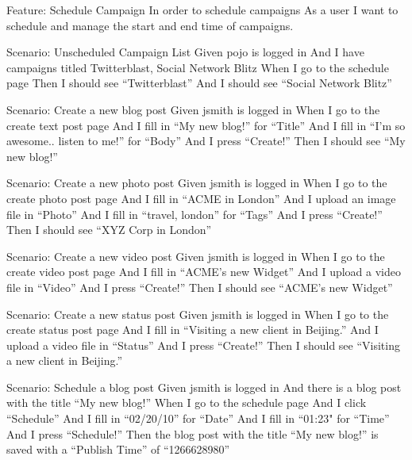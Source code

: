 \documentclass[12pt]{article}
\begin{document}
\begin{hangparas}{0.25in}{1}
Feature: Schedule Campaign 
In order to schedule campaigns 
As a user 
I want to schedule and manage the start and end time of campaigns. 

Scenario: Unscheduled Campaign List 
  Given pojo is logged in 
  And I have campaigns titled Twitterblast, Social Network Blitz 
  When I go to the schedule page 
  Then I should see ``Twitterblast'' 
  And I should see ``Social Network Blitz'' 
  
Scenario: Create a new blog post 
  Given jsmith is logged in 
  When I go to the create text post page 
  And I fill in ``My new blog!'' for ``Title''
  And I fill in ``I'm so awesome.. listen to me!'' for ``Body'' 
  And I press ``Create!'' 
  Then I should see ``My new blog!'' 
  
Scenario: Create a new photo post 
  Given jsmith is logged in 
  When I go to the create photo post page 
  And I fill in ``ACME in London'' 
  And I upload an image file in ``Photo'' 
  And I fill in ``travel, london'' for ``Tags'' 
  And I press ``Create!'' 
  Then I should see ``XYZ Corp in London'' 
  
  Scenario: Create a new video post 
    Given jsmith is logged in 
    When I go to the create video post page 
    And I fill in ``ACME's new Widget'' 
    And I upload a video file in ``Video'' 
    And I press ``Create!'' 
    Then I should see ``ACME's new Widget'' 
  
  Scenario: Create a new status post 
    Given jsmith is logged in 
    When I go to the create status post page 
    And I fill in ``Visiting a new client in Beijing.'' 
    And I upload a video file in ``Status'' 
    And I press ``Create!'' 
    Then I should see ``Visiting a new client in Beijing.'' 

  Scenario: Schedule a blog post 
    Given jsmith is logged in 
    And there is a blog post with the title ``My new blog!'' 
    When I go to the schedule page 
    And I click ``Schedule'' 
    And I fill in ``02/20/10'' for ``Date''
    And I fill in ``01:23" for ``Time''
    And I press ``Schedule!'' 
    Then the blog post with the title ``My new blog!'' is saved with a ``Publish Time'' of ``1266628980'' 
\end{hangparas}
\end{document}
